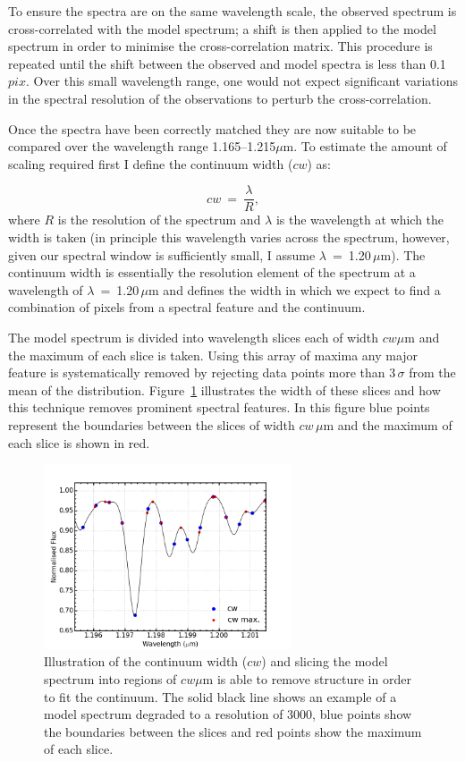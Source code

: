 To ensure the spectra are on the same wavelength scale, the observed spectrum is cross-correlated with the model spectrum;
a shift is then applied to the model spectrum in order to minimise the cross-correlation matrix.
This procedure is repeated until the shift between the observed and model spectra is less than 0.1\,$pix$.
Over this small wavelength range, one would not expect significant variations in the spectral resolution of the observations to perturb the cross-correlation.

Once the spectra have been correctly matched they are now suitable to be compared over the wavelength range 1.165--1.215$\mu$m.
To estimate the amount of scaling required first I define the continuum width ($cw$) as:

\begin{equation}
    cw~=~\frac{\lambda}{R}, %
\end{equation}
\noindent where $R$ is the resolution of the spectrum and
$\lambda$ is the wavelength at which the width is taken
(in principle this wavelength varies across the spectrum, however, given our spectral window is sufficiently small, I assume $\lambda$~=~1.20\,$\mu$m).
The continuum width is essentially the resolution element of the spectrum at a wavelength of
$\lambda$~=~1.20\,$\mu$m and defines the width in which we expect to find a combination of pixels from a spectral feature and the continuum.

The model spectrum is divided into wavelength slices each of width $cw\mu$m and the maximum of each slice is taken.
Using this array of maxima any major feature is systematically removed by rejecting data points more than 3\,$\sigma$ from the mean of the distribution.
Figure~\ref{fig:cw} illustrates the width of these slices and how this technique removes prominent spectral features.
In this figure blue points represent the boundaries between the slices of width $cw\,\mu$m and the maximum of each slice is shown in red.


\begin{figure}
 \centering
\includegraphics[width=0.65\textwidth]{JAnal/cw}
\caption[Illustration of continuum width slices and maxima]{
Illustration of the continuum width ($cw$) and slicing the model spectrum into regions of $cw\mu$m is able to remove structure in order to fit the continuum.
The solid black line shows an example of a model spectrum degraded to a resolution of 3000,
blue points show the boundaries between the slices and red points show the maximum of each slice.\label{fig:cw}
         }
\end{figure}


